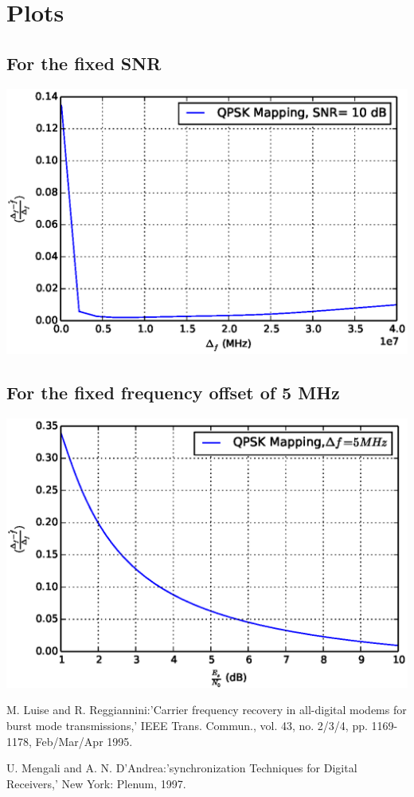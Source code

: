 \documentclass[journal,12pt,twocolumn]{IEEEtran}
\begin{document}
\section{Plots}
\subsection{For the fixed SNR}
\begin{center}
\includegraphics[scale=0.4]{./frequency_best.eps}
\end{center}

\subsection{For the fixed frequency offset of 5 MHz}
\begin{center}
\includegraphics[scale=0.4]{./frequencyestiamtion_best_error_vs_snr.eps}
\end{center}


\begin{thebibliography}{20}
M. Luise and R. Reggiannini:'Carrier frequency recovery in all-digital modems for burst mode transmissions,' IEEE Trans. Commun., vol. 43,
no. 2/3/4, pp. 1169-1178, Feb/Mar/Apr 1995.

U. Mengali and A. N. D'Andrea:'synchronization Techniques for Digital Receivers,' New York: Plenum, 1997.


\end{thebibliography}
\end{document}
